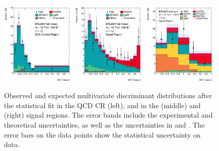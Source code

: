 \begin{figure}[!htbp]
\begin{center}
\includegraphics[width=0.325\textwidth]{figures/4l/BDT_4l_QCD_CR_postFit.pdf}
\includegraphics[width=0.325\textwidth]{figures/4l/BDT_4l_SR_postFit.pdf}
\includegraphics[width=0.325\textwidth]{figures/llvv/BDT_2l2v_SR_postFit.pdf}\\
\end{center}
\caption{Observed and expected multivariate discriminant distributions after the statistical fit 
        in the \lllljj QCD CR (left), 
        and in the \lllljj (middle) and \llvvjj (right) signal regions.
        The error bands include the experimental and theoretical uncertainties, 
        as well as the uncertainties in \muEW and \muQCD.
        The error bars on the data points show the statistical uncertainty on data.
        }
\label{fig:MVA}
\end{figure}
